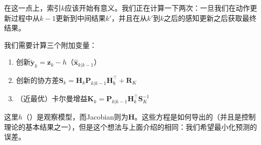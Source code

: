 
在这一点上，索引$k$应该开始有意义。我们正在计算一下两次：一旦我们在动作更新过程中从$k-1$更新到中间结果$k'$，并且在从$k'$到$k$之后的感知更新之后获取最终结果。

我们需要计算三个附加变量：

\begin{enumerate}

\item 创新$\tilde{\boldsymbol{y}}_{k}=\boldsymbol{z}_{k}-h（\hat{\boldsymbol{x}}_{k|k-1}）$
\item 创新的协方差$\boldsymbol{S}_{k}={\boldsymbol{H}_{k}}\boldsymbol{P}_{k|k-1}{\boldsymbol{H}_{ķ}^\top}+\boldsymbol{R}_{K}$
\item （近最优）卡尔曼增益$\boldsymbol{K}_{k}=\boldsymbol{P}_{k|k-1}{\boldsymbol{H}_{k}^\top}\boldsymbol{S}_{K}^{-1}$
\end{enumerate}


这里$h（）$是观察模型，而Jacobian则为$\boldsymbol{H}$。这些方程是如何导出的（并且是控制理论的基本结果之一），但是这个想法与上面介绍的相同：我们希望最小化预测的误差。


